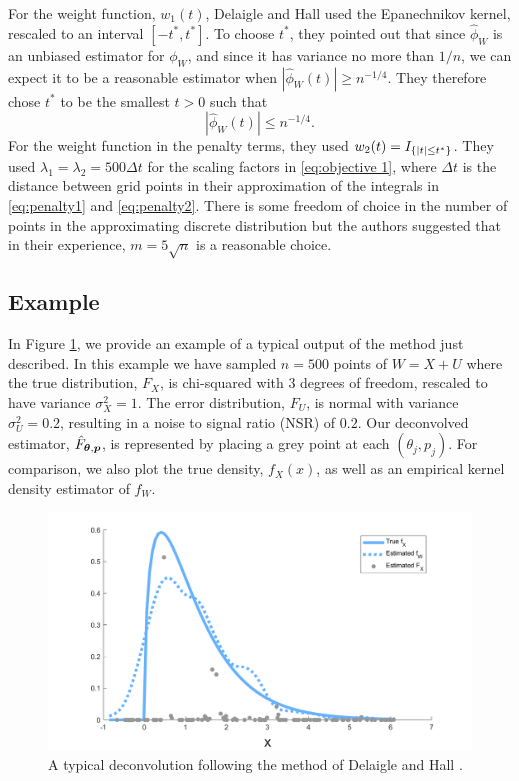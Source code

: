 	For the weight function, $w_1(t)$, Delaigle and Hall \cite{Delaigle2016-la} used the Epanechnikov kernel, rescaled to an interval $[-t^*, t^*]$. To choose $t^*$, they pointed out that since $\hat{\phi}_W$ is an unbiased estimator for $\phi_W$, and since it has variance no more than $1/n$, we can expect it to be a reasonable estimator when $|\hat{\phi}_W(t)| \geq n^{-1/4}$. They therefore chose $t^*$ to be the smallest $t > 0$ such that 
	\begin{equation}
	\label{eq:define t star}
		\left|\hat{\phi}_W(t)\right| \leq n^{-1/4}.
	\end{equation}
	For the weight function in the penalty terms, they used $w_2(t) = I_{\{|t| \leq t^*\}}$. They used $\lambda_1 = \lambda_2 = 500 \Delta t$ for the scaling factors in \eqref{eq:objective 1}, where $\Delta t$ is the distance between grid points in their approximation of the integrals in \eqref{eq:penalty1} and \eqref{eq:penalty2}.
	There is some freedom of choice in the number of points in the approximating discrete distribution but the authors suggested that in their experience, $m = 5\sqrt{n}$ is a reasonable choice.

	\subsection{Example}
	In Figure \ref{fig:fixed masses example no smoothing}, we provide an example of a typical output of the method just described. In this example we have sampled $n = 500$ points of $W = X+U$ where the true distribution, $F_X$, is chi-squared with 3 degrees of freedom, rescaled to have variance $\sigma_X^2 = 1$. The error distribution, $F_U$, is normal with variance $\sigma_U^2 = 0.2$, resulting in a noise to signal ratio (NSR) of $0.2$. Our deconvolved estimator, $\hat{F}_{{\bm{{\theta}}}, {\bm{{p}}}}$, is represented by placing a grey point at each $(\theta_j, p_j)$. For comparison, we also plot the true density, $f_X(x)$, as well as an empirical kernel density estimator of $f_W$.

	\begin{figure}[ht]
		\centering
		\includegraphics[width = \textwidth]{Figures/Deconvolution/fixed_masses_example_nosmoothing.png}
		\caption{A typical deconvolution following the method of Delaigle and Hall \cite{Delaigle2016-la}.}
		\label{fig:fixed masses example no smoothing}
	\end{figure}

